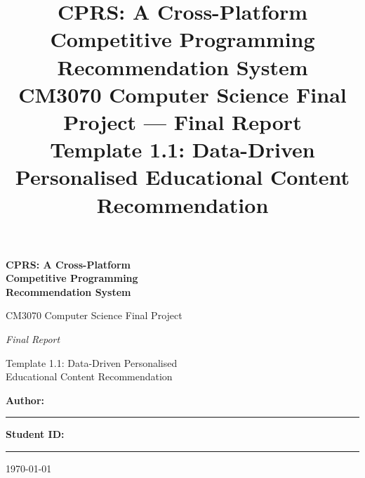 \documentclass[12pt,a4paper]{article}
\title{\textbf{CPRS: A Cross-Platform Competitive Programming Recommendation System} \\[1em]
\large CM3070 Computer Science Final Project --- Final Report \\[0.5em]
\large Template 1.1: Data-Driven Personalised Educational Content Recommendation}
\author{}
\date{}
\begin{document}
\begin{titlepage}
\centering
\vspace*{2.5cm}
{\Huge\bfseries CPRS: A Cross-Platform\\[0.3em] Competitive Programming\\[0.3em]
Recommendation System\par}
\vspace{2cm}
{\Large CM3070 Computer Science Final Project\par}
\vspace{0.4em}
{\Large\itshape Final Report\par}
\vspace{1.2em}
{\large Template 1.1: Data-Driven Personalised\\Educational Content Recommendation\par}
\vfill
{\large \textbf{Author:}\quad\rule{5cm}{0.4pt}\par}
\vspace{0.4em}
{\large \textbf{Student ID:}\quad\rule{5cm}{0.4pt}\par}
\vspace{1.5em}
{\large \today\par}
\end{titlepage}
\end{document}
